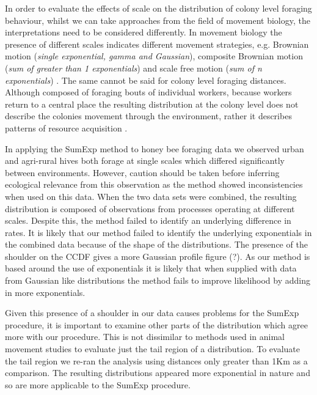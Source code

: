 \documentclass[11pt,usenames,dvipsnames]{article}
\begin{document}
\begin{linenumbers}
\hspace{\parindent}
In order to evaluate the effects of scale on the distribution of colony level foraging behaviour, whilst we can take approaches from the field of movement biology, the interpretations need to be considered differently. In movement biology the presence of different scales indicates different movement strategies, e.g. Brownian motion (\textit{single exponential, gamma and Gaussian}), composite Brownian motion (\textit{sum of greater than 1 exponentials}) and scale free motion (\textit{sum of n exponentials}) \citep{Murphy2007, Petrovskii2011, Gautestad2012, Zhao2016, Sakamoto2017, Reynolds2018}. The same cannot be said for colony level foraging distances. Although composed of foraging bouts of individual workers, because workers return to a central place the resulting distribution at the colony level does not describe the colonies movement through the environment, rather it describes patterns of resource acquisition \citep{Visscher1982, Waddington1994, Couvillon2014, Couvillon2015}.

In applying the SumExp method to honey bee foraging data we observed urban and agri-rural hives both forage at single scales which differed significantly between environments. However, caution should be taken before inferring ecological relevance from this observation as the method showed inconsistencies when used on this data. When the two data sets were combined, the resulting distribution is composed of observations from processes operating at different scales. Despite this, the method failed to identify an underlying difference in rates. It is likely that our method failed to identify the underlying exponentials in the combined data because of the shape of the distributions. The presence of the shoulder on the CCDF gives a more Gaussian profile figure (?). As our method is based around the use of exponentials it is likely that when supplied with data from Gaussian like distributions the method fails to improve likelihood by adding in more exponentials.

Given this presence of a shoulder in our data causes problems for the SumExp procedure, it is important to examine other parts of the distribution which agree more with our procedure. This is not dissimilar to methods used in animal movement studies to evaluate just the tail region of a distribution. To evaluate the tail region we re-ran the analysis using distances only greater than 1Km as a comparison. The resulting distributions appeared more exponential in nature and so are more applicable to the SumExp procedure.


\end{linenumbers}
\end{document}
